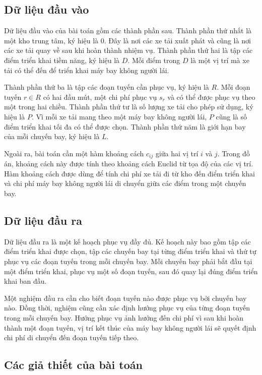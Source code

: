 \subsection{Dữ liệu đầu vào}

Dữ liệu đầu vào của bài toán gồm các thành phần sau. Thành phần thứ nhất là một kho trung tâm, ký hiệu là $0$. Đây là nơi các xe tải xuất phát và cũng là nơi các xe tải quay về sau khi hoàn thành nhiệm vụ. Thành phần thứ hai là tập các điểm triển khai tiềm năng, ký hiệu là $D$. Mỗi điểm trong $D$ là một vị trí mà xe tải có thể đến để triển khai máy bay không người lái.

Thành phần thứ ba là tập các đoạn tuyến cần phục vụ, ký hiệu là $R$. Mỗi đoạn tuyến $r \in R$ có hai đầu mút, một chi phí phục vụ $s_r$ và có thể được phục vụ theo một trong hai chiều. Thành phần thứ tư là số lượng xe tải cho phép sử dụng, ký hiệu là $P$. Vì mỗi xe tải mang theo một máy bay không người lái, $P$ cũng là số điểm triển khai tối đa có thể được chọn. Thành phần thứ năm là giới hạn bay của mỗi chuyến bay, ký hiệu là $L$.

Ngoài ra, bài toán cần một hàm khoảng cách $c_{ij}$ giữa hai vị trí $i$ và $j$. Trong đồ án, khoảng cách này được tính theo khoảng cách Euclid từ tọa độ của các vị trí. Hàm khoảng cách được dùng để tính chi phí xe tải đi từ kho đến điểm triển khai và chi phí máy bay không người lái di chuyển giữa các điểm trong một chuyến bay.

\subsection{Dữ liệu đầu ra}

Dữ liệu đầu ra là một kế hoạch phục vụ đầy đủ. Kế hoạch này bao gồm tập các điểm triển khai được chọn, tập các chuyến bay tại từng điểm triển khai và thứ tự phục vụ các đoạn tuyến trong mỗi chuyến bay. Mỗi chuyến bay phải bắt đầu tại một điểm triển khai, phục vụ một số đoạn tuyến, sau đó quay lại đúng điểm triển khai ban đầu.

Một nghiệm đầu ra cần cho biết đoạn tuyến nào được phục vụ bởi chuyến bay nào. Đồng thời, nghiệm cũng cần xác định hướng phục vụ của từng đoạn tuyến trong mỗi chuyến bay. Hướng phục vụ ảnh hưởng đến chi phí vì sau khi hoàn thành một đoạn tuyến, vị trí kết thúc của máy bay không người lái sẽ quyết định chi phí di chuyển đến đoạn tuyến tiếp theo.

\subsection{Các giả thiết của bài toán}

